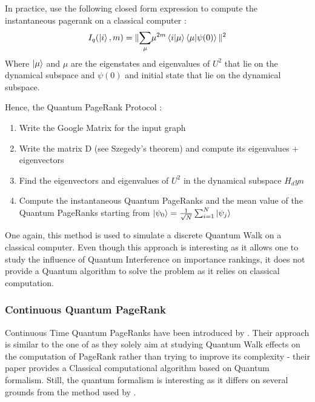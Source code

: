 \documentclass{article}
\begin{document}
In practice, \cite{paparo_martin-delgado_2012} use the following closed form expression to compute the instantaneous pagerank on a classical computer : 
\begin{equation*}
    I_q(\ket{i}, m) = \| \underset{\mu}{\sum} \mu^{2m} \braket{i|\mu} \braket{\mu|\psi(0)} \|^2
\end{equation*}
Where $\ket{\mu}$ and $\mu$ are the eigenstates and eigenvalues of $U^2$ that lie on the dynamical subspace and $\psi(0)$ and initial state that lie on the dynamical subspace.

Hence, the Quantum PageRank Protocol \cite{paparo_martin-delgado_2012}:
\begin{enumerate}
    \item Write the Google Matrix for the input graph
    \item Write the matrix D (see Szegedy's theorem) and compute its eigenvalues + eigenvectors
    \item Find the eigenvectors and eigenvalues of $U^2$ in the dynamical subspace $H_dyn$
    \item Compute the instantaneous Quantum PageRanks and the mean value of the Quantum PageRanks starting from $\ket{\psi_0} = \frac{1}{\sqrt{N}} \sum_{i=1}^N \ket{\psi_j}$
\end{enumerate}


One again, this method is used to simulate a discrete Quantum Walk on a classical computer. Even though this approach is interesting as it allows one to study the influence of Quantum Interference on importance rankings, it does not provide a Quantum algorithm to solve the problem as it relies on classical computation.

\subsubsection{Continuous Quantum PageRank}

Continuous Time Quantum PageRanks have been introduced by \cite{sánchez-burillo_duch_gómez-gardeñes_zueco_2012}. Their approach is similar to the one of \cite{paparo_martin-delgado_2012} as they solely aim at studying Quantum Walk effects on the computation of PageRank rather than trying to improve its complexity - their paper provides a Classical computational algorithm based on Quantum formalism. Still, the quantum formalism is interesting as it differs on several grounds from the method used by \cite{paparo_martin-delgado_2012}. 
\end{document}
